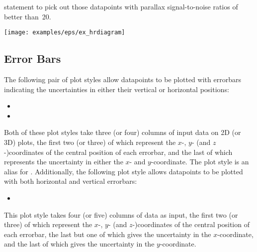 {statement to pick out those datapoints with parallax signal-to-noise ratios of
better than~20.
\nlscf
{}\newline
{}\newline
{}\newline
{}\newline
{}\newline
{}\newline
{}\newline
{}
\nlscf
\centerline{\texttt{[image: examples/eps/ex\_hrdiagram]}}
}

\subsection{Error Bars}
\label{sec:errorbars}

The following pair of plot styles allow datapoints to be plotted with errorbars
indicating the uncertainties in either their vertical or horizontal positions:
\begin{itemize}
\item {}
\item {}
\end{itemize}
Both of these plot styles take three (or four) columns of input data on 2D (or
3D) plots, the first two (or three) of which represent the $x$-, $y$- (and
$z$-)coordinates of the central position of each errorbar, and the last of
which represents the uncertainty in either the $x$- and $y$-coordinate. The
plot style  is an alias for .
Additionally, the following plot style allows datapoints to be plotted with
both horizontal and vertical errorbars:
\begin{itemize}
\item {}
\end{itemize}
This plot style takes four (or five) columns of data as input, the first two
(or three) of which represent the $x$-, $y$- (and $z$-)coordinates of the
central position of each errorbar, the last but one of which gives the
uncertainty in the $x$-coordinate, and the last of which gives the uncertainty
in the $y$-coordinate.

